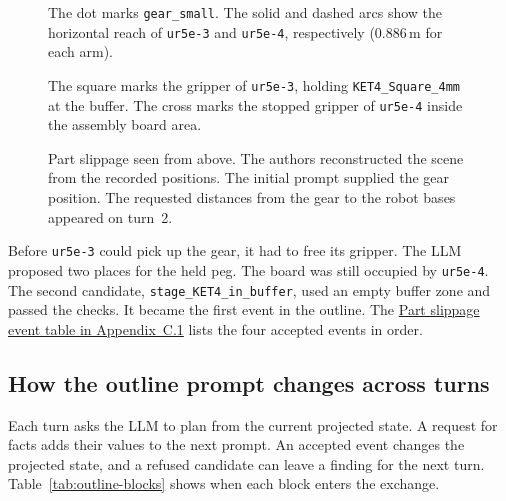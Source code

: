 \documentclass[preprint,12pt,authoryear]{elsarticle}
\let\code\nolinkurl
\begin{document}
\begin{figure}[ht!]
\begin{minipage}[c]{0.51\linewidth}
\end{minipage}\hfill
\begin{minipage}[c]{0.46\linewidth}
\small\raggedright
The dot marks \code{gear_small}. The solid and dashed arcs show the
horizontal reach of \code{ur5e-3} and \code{ur5e-4}, respectively
(0.886\,m for each arm).
\par\smallskip
The square marks the gripper of \code{ur5e-3}, holding \code{KET4_Square_4mm}
at the buffer. The cross marks the stopped gripper of \code{ur5e-4} inside
the assembly board area.
\end{minipage}
\caption{Part slippage seen from above. The authors reconstructed the scene from the recorded positions. The initial prompt supplied the gear position. The requested distances from the gear to the robot bases appeared on turn~2.}
\label{fig:failure-scene}
\end{figure}

Before \code{ur5e-3} could pick up the gear, it had to free its gripper.
The LLM proposed two places for the held peg. The board was still occupied
by \code{ur5e-4}. The second candidate, \code{stage_KET4_in_buffer}, used an
empty buffer zone and passed the checks. It became the first event in the
outline. The \hyperref[sec:gazebo-slippage]{Part slippage event table in
Appendix~C.1} lists the four accepted events in order.

\subsection{How the outline prompt changes across turns}\label{sec:outline-feedback}

Each turn asks the LLM to plan from the current projected state. A request for
facts adds their values to the next prompt. An accepted event changes the
projected state, and a refused candidate can leave a finding for the next turn.
Table~\ref{tab:outline-blocks} shows when each block enters the exchange.
\end{document}
